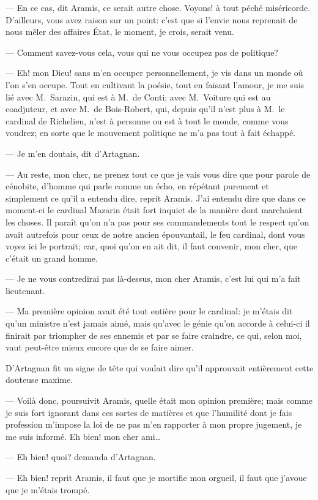 — En ce cas, dit Aramis, ce serait autre chose. Voyons! à tout péché miséricorde. D'ailleurs, vous avez raison sur un point: c'est que si l'envie nous reprenait de nous mêler des affaires État, le moment, je crois, serait venu.

— Comment savez-vous cela, vous qui ne vous occupez pas de politique?

— Eh! mon Dieu! sans m'en occuper personnellement, je vis dans un monde où l'on s'en occupe. Tout en cultivant la poésie, tout en faisant l'amour, je me suis lié avec M.~Sarazin, qui est à M.~de Conti; avec M.~Voiture qui est au coadjuteur, et avec M.~de Bois-Robert, qui, depuis qu'il n'est plus à M.~le cardinal de Richelieu, n'est à personne ou est à tout le monde, comme vous voudrez; en sorte que le mouvement politique ne m'a pas tout à fait échappé.

— Je m'en doutais, dit d'Artagnan.

— Au reste, mon cher, ne prenez tout ce que je vais vous dire que pour parole de cénobite, d'homme qui parle comme un écho, en répétant purement et simplement ce qu'il a entendu dire, reprit Aramis. J'ai entendu dire que dans ce moment-ci le cardinal Mazarin était fort inquiet de la manière dont marchaient les choses. Il paraît qu'on n'a pas pour ses commandements tout le respect qu'on avait autrefois pour ceux de notre ancien épouvantail, le feu cardinal, dont vous voyez ici le portrait; car, quoi qu'on en ait dit, il faut convenir, mon cher, que c'était un grand homme.

— Je ne vous contredirai pas là-dessus, mon cher Aramis, c'est lui qui m'a fait lieutenant.

— Ma première opinion avait été tout entière pour le cardinal: je m'étais dit qu'un ministre n'est jamais aimé, mais qu'avec le génie qu'on accorde à celui-ci il finirait par triompher de ses ennemis et par se faire craindre, ce qui, selon moi, vaut peut-être mieux encore que de se faire aimer.

D'Artagnan fit un signe de tête qui voulait dire qu'il approuvait entièrement cette douteuse maxime.

— Voilà donc, poursuivit Aramis, quelle était mon opinion première; mais comme je suis fort ignorant dans ces sortes de matières et que l'humilité dont je fais profession m'impose la loi de ne pas m'en rapporter à mon propre jugement, je me suis informé. Eh bien! mon cher ami\dots

— Eh bien! quoi? demanda d'Artagnan.

— Eh bien! reprit Aramis, il faut que je mortifie mon orgueil, il faut que j'avoue que je m'étais trompé.

